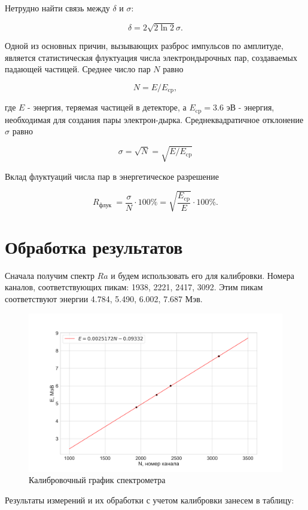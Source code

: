 \documentclass[a4paper, 12pt]{article}
\begin{document}
Нетрудно найти связь между $\delta$ и $\sigma$:

$$
\delta=2 \sqrt{2 \ln 2} \sigma .
$$

Одной из основных причин, вызывающих разброс импульсов по амплитуде, является статистическая флуктуация числа электрондырочных пар, создаваемых падающей частицей. Среднее число пар $N$ равно

$$
N=E / E_{\mathrm{cp}},
$$

где $E$ - энергия, теряемая частицей в детекторе, а $E_{\mathrm{cp}}=3.6$ эВ - энергия, необходимая для создания пары электрон-дырка. Среднеквадратичное отклонение $\sigma$ равно

$$
\sigma=\sqrt{N}=\sqrt{E / E_{\mathrm{cp}}}
$$

Вклад флуктуаций числа пар в энергетическое разрешение

$$
R_{\text {флук }}=\frac{\sigma}{N} \cdot 100 \%=\sqrt{\frac{E_{\mathrm{cp}}}{E}} \cdot 100 \% .
$$

\section{Обработка результатов}
Сначала получим спектр $Ra$ и будем использовать его для калибровки. Номера каналов, соответствующих пикам: 1938, 2221, 2417, 3092. Этим пикам соответствуют энергии 4.784, 5.490, 6.002, 7.687 Мэв.
\begin{figure}[H]
	\centering
	\includegraphics[width=1\textwidth]{plot_calib.png}  \caption{Калибровочный график спектрометра}
	\label{fig:calib}
\end{figure}
Результаты измерений и их обработки с учетом калибровки занесем в таблицу:
\end{document}
